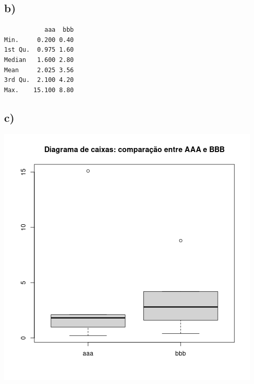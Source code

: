 \documentclass[11pt]{article}
\begin{document}
\subsection*{b)}
\label{sec:org09a4082}

\begin{verbatim}
           aaa  bbb
Min.     0.200 0.40
1st Qu.  0.975 1.60
Median   1.600 2.80
Mean     2.025 3.56
3rd Qu.  2.100 4.20
Max.    15.100 8.80
\end{verbatim}

\subsection*{c)}
\label{sec:org367c05f}

\begin{center}
\includegraphics[width=.9\linewidth]{boxplot.png}
\end{center}
\end{document}
